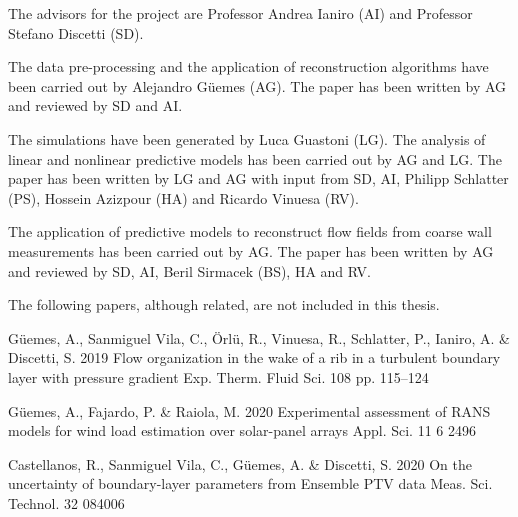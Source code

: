 %
\begin{divisionofwork}
	The advisors for the project are Professor Andrea Ianiro (AI) and Professor Stefano Discetti (SD).

	\paperitem
		The data pre-processing and the application of reconstruction algorithms have been carried out by Alejandro Güemes (AG).
		The paper has been written by AG and reviewed by SD and AI.

	\paperitem
		The simulations have been generated by Luca Guastoni (LG).
		The analysis of linear and nonlinear predictive models has been carried out by AG and LG.
		The paper has been written by LG and AG with input from SD, AI, Philipp Schlatter (PS), Hossein Azizpour (HA) and Ricardo Vinuesa (RV).

	\paperitem
		The application of predictive models to reconstruct flow fields from coarse wall measurements has been carried out by AG.
		The paper has been written by AG and reviewed by SD, AI, Beril Sirmacek (BS), HA and RV.

\end{divisionofwork}


%
\clearpage
\begin{otherpublications}
	The following papers, although related, are not included in this thesis.

  \paperitem%
    {Güemes, A., Sanmiguel Vila, C., Örlü, R., Vinuesa, R., Schlatter, P., Ianiro, A. \& Discetti, S.}%
    {2019}%
    {Flow organization in the wake of a rib in a turbulent boundary layer with pressure gradient}%
    {Exp. Therm. Fluid Sci.}%
    {108}%
    {}%
    {pp. 115--124}%

	\paperitem%
		{Güemes, A., Fajardo, P. \& Raiola, M.}%
		{2020}%
		{Experimental assessment of RANS models for wind load estimation over solar-panel arrays}%
		{Appl. Sci.}%
		{11}%
		{6}%
		{2496}%

  \paperitem%
    {Castellanos, R., Sanmiguel Vila, C., Güemes, A. \& Discetti, S.}%
    {2020}%
    {On the uncertainty of boundary-layer parameters from Ensemble PTV data}%
    {Meas. Sci. Technol.}%
    {32}%
    {}%
    {084006}%

\end{otherpublications}


